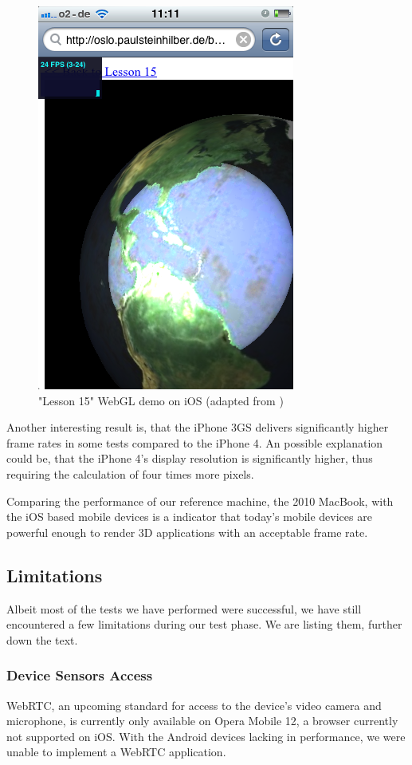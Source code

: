 \documentclass[12pt,journal,compsoc]{IEEEtran}
\begin{document}
\begin{figure}[htb]
	\begin{center}  
    \includegraphics[width=0.6\columnwidth]{grafiken/lesson15_iOS}
      \caption{"Lesson 15" WebGL demo on iOS (adapted from \cite{lesson15})}
      \label{fig:lesson15_iOS}
    \end{center}
\end{figure}

Another interesting result is, that the iPhone 3GS delivers significantly higher frame rates in some tests compared to the iPhone 4. An possible explanation could be, that the iPhone 4’s display resolution is significantly higher, thus requiring the calculation of four times more pixels. 

Comparing the performance of our reference machine, the 2010 MacBook, with the iOS based mobile devices is a indicator that today's mobile devices are powerful enough to render 3D applications with an acceptable frame rate.

\subsection{Limitations}
Albeit most of the tests we have performed were successful, we have still encountered a few limitations during our test phase. We are listing them, further down the text.

\subsubsection{Device Sensors Access}\label{deviceSensors}
WebRTC, an upcoming standard for access to the device’s video camera and microphone, is currently only available on Opera Mobile 12, a browser currently not supported on iOS. With the Android devices lacking in performance, we were unable to implement a WebRTC application.
\end{document}
